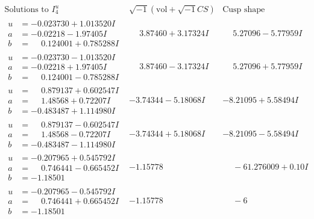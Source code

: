 \documentclass[1p]{elsarticle_modified}
\theoremstyle{definition}
\newcommand{\I}{\sqrt{-1}}
\begin{document}
$$\begin{array}{c|c|c}  
\text{Solutions to }I^u_{4}& \I (\text{vol} + \sqrt{-1}CS) & \text{Cusp shape}\\
 \hline 
\begin{aligned}
u &= -0.023730 + 1.013520 I \\
a &= -0.02218 - 1.97405 I \\
b &= \phantom{-}0.124001 + 0.785288 I\end{aligned}
 & \phantom{-}3.87460 + 3.17324 I & \phantom{-}5.27096 - 5.77959 I \\ \hline\begin{aligned}
u &= -0.023730 - 1.013520 I \\
a &= -0.02218 + 1.97405 I \\
b &= \phantom{-}0.124001 - 0.785288 I\end{aligned}
 & \phantom{-}3.87460 - 3.17324 I & \phantom{-}5.27096 + 5.77959 I \\ \hline\begin{aligned}
u &= \phantom{-}0.879137 + 0.602547 I \\
a &= \phantom{-}1.48568 + 0.72207 I \\
b &= -0.483487 + 1.114980 I\end{aligned}
 & -3.74344 - 5.18068 I & -8.21095 + 5.58494 I \\ \hline\begin{aligned}
u &= \phantom{-}0.879137 - 0.602547 I \\
a &= \phantom{-}1.48568 - 0.72207 I \\
b &= -0.483487 - 1.114980 I\end{aligned}
 & -3.74344 + 5.18068 I & -8.21095 - 5.58494 I \\ \hline\begin{aligned}
u &= -0.207965 + 0.545792 I \\
a &= \phantom{-}0.746441 - 0.665452 I \\
b &= -1.18501\phantom{ +0.000000I}\end{aligned}
 & -1.15778\phantom{ +0.000000I} & \phantom{-}                -6
1.276009 + 0. 10   I\phantom{ +0.000000I} \\ \hline\begin{aligned}
u &= -0.207965 - 0.545792 I \\
a &= \phantom{-}0.746441 + 0.665452 I \\
b &= -1.18501\phantom{ +0.000000I}\end{aligned}
 & -1.15778\phantom{ +0.000000I} & \phantom{-}                -6

\end{array}$$
\end{document}
